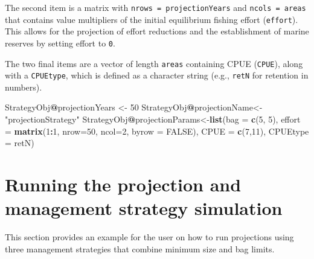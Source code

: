 \documentclass[
]{book}
\newenvironment{Shaded}{\begin{snugshade}}{\end{snugshade}}
\newcommand{\AttributeTok}[1]{\textcolor[rgb]{0.13,0.29,0.53}{#1}}
\newcommand{\ConstantTok}[1]{\textcolor[rgb]{0.56,0.35,0.01}{#1}}
\newcommand{\DecValTok}[1]{\textcolor[rgb]{0.00,0.00,0.81}{#1}}
\newcommand{\FunctionTok}[1]{\textcolor[rgb]{0.13,0.29,0.53}{\textbf{#1}}}
\newcommand{\NormalTok}[1]{#1}
\newcommand{\OtherTok}[1]{\textcolor[rgb]{0.56,0.35,0.01}{#1}}
\newcommand{\SpecialCharTok}[1]{\textcolor[rgb]{0.81,0.36,0.00}{\textbf{#1}}}
\newcommand{\StringTok}[1]{\textcolor[rgb]{0.31,0.60,0.02}{#1}}
\begin{document}
The second item is a matrix with \texttt{nrows\ =\ projectionYears} and \texttt{ncols\ =\ areas} that contains value multipliers of the initial equilibrium fishing effort (\texttt{effort}). This allows for the projection of effort reductions and the establishment of marine reserves by setting effort to \texttt{0}.

The two final items are a vector of length \texttt{areas} containing CPUE (\texttt{CPUE}), along with a \texttt{CPUEtype}, which is defined as a character string (e.g., \texttt{retN} for retention in numbers).

\begin{Shaded}
\begin{Highlighting}[]
\NormalTok{StrategyObj}\SpecialCharTok{@}\NormalTok{projectionYears }\OtherTok{\textless{}{-}} \DecValTok{50}
\NormalTok{StrategyObj}\SpecialCharTok{@}\NormalTok{projectionName}\OtherTok{\textless{}{-}}\StringTok{"projectionStrategy"}
\NormalTok{StrategyObj}\SpecialCharTok{@}\NormalTok{projectionParams}\OtherTok{\textless{}{-}}\FunctionTok{list}\NormalTok{(}\AttributeTok{bag =} \FunctionTok{c}\NormalTok{(}\DecValTok{5}\NormalTok{, }\DecValTok{5}\NormalTok{), }\AttributeTok{effort =} \FunctionTok{matrix}\NormalTok{(}\DecValTok{1}\SpecialCharTok{:}\DecValTok{1}\NormalTok{, }\AttributeTok{nrow=}\DecValTok{50}\NormalTok{, }\AttributeTok{ncol=}\DecValTok{2}\NormalTok{, }\AttributeTok{byrow =} \ConstantTok{FALSE}\NormalTok{), }\AttributeTok{CPUE =} \FunctionTok{c}\NormalTok{(}\DecValTok{7}\NormalTok{,}\DecValTok{11}\NormalTok{), }\AttributeTok{CPUEtype =} \StringTok{\textquotesingle{}retN\textquotesingle{}}\NormalTok{)}
\end{Highlighting}
\end{Shaded}

\section{Running the projection and management strategy simulation}\label{running-the-projection-and-management-strategy-simulation}

This section provides an example for the user on how to run projections using three management strategies that combine minimum size and bag limits.
\end{document}
